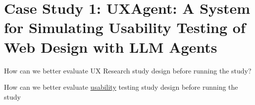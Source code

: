 \documentclass[scheme=plain,aspectratio=169]{beamer}
\begin{document}






\section[Case Study 1: UXAgent]{Case Study 1: UXAgent: A System for Simulating Usability Testing of Web Design with LLM Agents}



\begin{frame}[standout]
  How can we better evaluate UX Research study design before running the study?
\end{frame}

\begin{frame}[standout]
  How can we better evaluate \ul{usability} testing study design before running the study
\end{frame}

\end{document}

